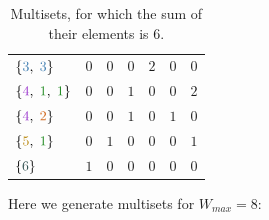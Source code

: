 \documentclass[12pt]{article}
\begin{document}
\begin{table}[!hb]
\begin{tabular}{|l|ccccc|c|}
  $\{{\color{c3}3}, \; {\color{c3}3}\}$ 
    & \color{c6}$0$ & \color{c5}$0$ & \color{c4}$0$ & \color{c3}$2$ 
    & \color{c2}$0$ & \color{c1}$0$                                           \\
  $\{{\color{c4}4}, \; {\color{c1}1}, \; {\color{c1}1}\}$ 
    & \color{c6}$0$ & \color{c5}$0$ & \color{c4}$1$ & \color{c3}$0$ 
    & \color{c2}$0$ & \color{c1}$2$                                           \\
  $\{{\color{c4}4}, \; {\color{c2}2}\}$ 
    & \color{c6}$0$ & \color{c5}$0$ & \color{c4}$1$ & \color{c3}$0$ 
    & \color{c2}$1$ & \color{c1}$0$                                           \\
  $\{{\color{c5}5}, \; {\color{c1}1}\}$ 
    & \color{c6}$0$ & \color{c5}$1$ & \color{c4}$0$ & \color{c3}$0$ 
    & \color{c2}$0$ & \color{c1}$1$                                           \\
  $\{{\color{c6}6}\}$ 
    & \color{c6}$1$ & \color{c5}$0$ & \color{c4}$0$ & \color{c3}$0$ 
    & \color{c2}$0$ & \color{c1}$0$                                           \\  
  \hline
  \end{tabular}
  \caption{Multisets, for which the sum of their elements is $6$.}
  \label{tab:ex4}
\end{table}  

Here we generate multisets for $W_{max} = 8$:
\end{document}
